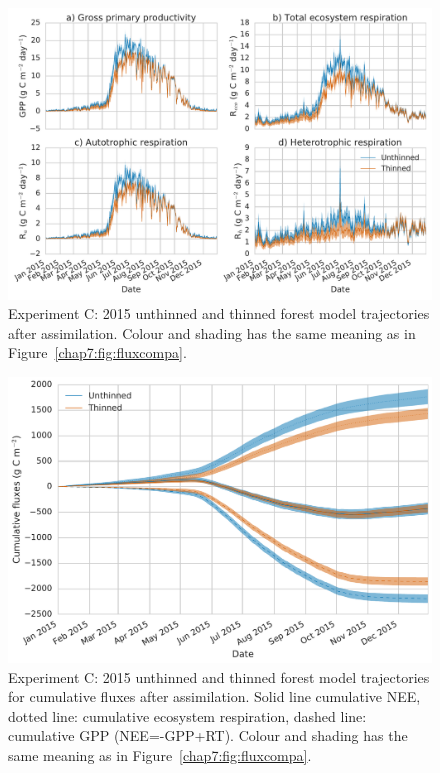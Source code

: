   \begin{figure}
 \noindent\includegraphics[width=30pc]{chapter/chapter7/flux_compc.pdf}
\caption{Experiment C: 2015 unthinned and thinned forest model trajectories after assimilation. Colour and shading has the same meaning as in Figure~\ref{chap7:fig:fluxcompa}.}
 \label{chap7:fig:fluxcompc}
 \end{figure}
 
  \begin{figure}
 \noindent\includegraphics[width=30pc]{chapter/chapter7/cum_fluxc.pdf}
\caption{Experiment C: 2015 unthinned and thinned forest model trajectories for cumulative fluxes after assimilation. Solid line cumulative NEE, dotted line: cumulative ecosystem respiration, dashed line: cumulative GPP (NEE=-GPP+RT). Colour and shading has the same meaning as in Figure~\ref{chap7:fig:fluxcompa}.}
 \label{chap7:fig:fluxcumc}
 \end{figure}
 
